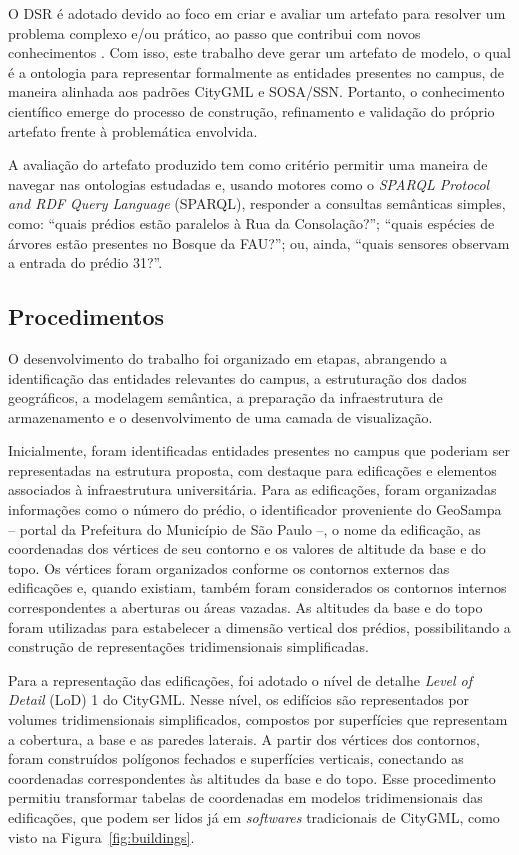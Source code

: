 \documentclass[
  article,   %
  11pt,      %
  oneside,   %
  a4paper,   %
  english,   %
  brazil,    %
  sumario=tradicional
]{abntex2}
\newcommand{\en}[1]{\foreignlanguage{english}{\textit{#1}}}
\begin{document}
O DSR é adotado devido ao foco em criar e avaliar um artefato para resolver um problema complexo
e/ou prático, ao passo que contribui com novos conhecimentos \cite{hevner_2004}.
Com isso, este trabalho deve gerar um artefato de modelo, o qual é a ontologia para representar
formalmente as entidades presentes no campus, de maneira alinhada aos padrões CityGML e SOSA/SSN.
Portanto, o conhecimento científico emerge do processo de construção, refinamento e validação do
próprio artefato frente à problemática envolvida.

A avaliação do artefato produzido tem como critério permitir uma maneira de navegar nas ontologias
estudadas e, usando motores como o \en{SPARQL Protocol and RDF Query Language} (SPARQL),
responder a consultas semânticas simples, como: ``quais prédios estão paralelos à Rua da
Consolação?''; ``quais espécies de árvores estão presentes no Bosque da FAU?''; ou, ainda, ``quais
sensores observam a entrada do prédio 31?''.

\subsection{Procedimentos}

O desenvolvimento do trabalho foi organizado em etapas, abrangendo a identificação das entidades
relevantes do campus, a estruturação dos dados geográficos, a modelagem semântica, a preparação da
infraestrutura de armazenamento e o desenvolvimento de uma camada de visualização.

Inicialmente, foram identificadas entidades presentes no campus que poderiam ser representadas na
estrutura proposta, com destaque para edificações e elementos associados à infraestrutura
universitária.
Para as edificações, foram organizadas informações como o número do prédio, o identificador proveniente
do GeoSampa -- portal da Prefeitura do Município de São Paulo --, o nome da edificação, as coordenadas dos vértices de seu contorno e os valores de altitude
da base e do topo.
Os vértices foram organizados conforme os contornos externos das edificações e, quando existiam,
também foram considerados os contornos internos correspondentes a aberturas ou áreas vazadas.
As altitudes da base e do topo foram utilizadas para estabelecer a dimensão vertical dos prédios,
possibilitando a construção de representações tridimensionais simplificadas.

Para a representação das edificações, foi adotado o nível de detalhe \en{Level of Detail} (LoD) 1 do CityGML.
Nesse nível, os edifícios são representados por volumes tridimensionais simplificados, compostos
por superfícies que representam a cobertura, a base e as paredes laterais.
A partir dos vértices dos contornos, foram construídos polígonos fechados e superfícies verticais,
conectando as coordenadas correspondentes às altitudes da base e do topo.
Esse procedimento permitiu transformar tabelas de coordenadas em modelos
tridimensionais das edificações, que podem ser lidos já em \en{softwares} tradicionais de CityGML, como visto na Figura~\ref{fig:buildings}.
\end{document}
